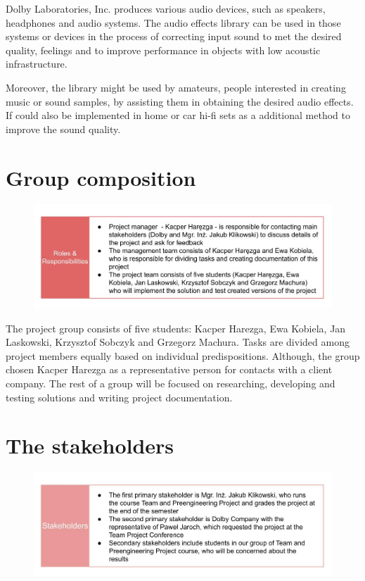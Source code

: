 \documentclass[12pt]{article}
\begin{document}
Dolby Laboratories, Inc. produces various audio devices, such as speakers, headphones and audio systems. The audio effects library can be used in those systems or devices in the process of correcting input sound to met the desired quality, feelings and to improve performance in objects with low acoustic infrastructure.

Moreover, the library might be used by amateurs, people interested in creating music or sound samples, by assisting them in obtaining the desired audio effects. If could also be implemented in home or car hi-fi sets as a additional method to improve the sound quality.

\section{Group composition}

	\begin{figure}[H]
		\includegraphics[width=1.2\textwidth, center]{Roles & Responsibilities}
	\end{figure}

The project group consists of five students: Kacper Harezga, Ewa Kobiela, Jan Laskowski, Krzysztof Sobczyk and Grzegorz Machura. Tasks are divided among project members equally based on individual predispositions. Although, the group chosen Kacper Harezga as a representative person for contacts with a client company. The rest of a group will be focused on researching, developing and testing solutions and writing project documentation.

\section{The stakeholders}

	\begin{figure}[H]
		\includegraphics[width=1.2\textwidth, center]{Stakeholders}
	\end{figure}
\end{document}
